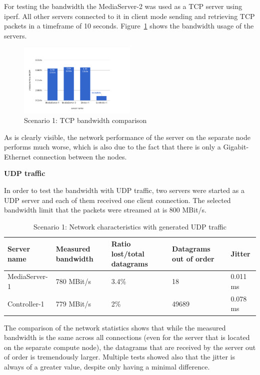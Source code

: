 For testing the bandwidth the MediaServer-2 was used as a TCP server using iperf. All other servers connected to it in client mode sending and retrieving TCP packets in a timeframe of 10 seconds. Figure~\ref{fig:scenario1-tcp} shows the bandwidth usage of the servers.

\begin{figure}[H]
\centering

\includegraphics[width=0.5\textwidth]{images/evaluation/testbed_scenario1_bw}

\caption{Scenario 1: TCP bandwidth comparison} \label{fig:scenario1-tcp}
\end{figure}

As is clearly visible, the network performance of the server on the separate node performs much worse, which is also due to the fact that there is only a Gigabit-Ethernet connection between the nodes.

\newpage
\textbf{UDP traffic} \label{sec:scenario1-udp}

In order to test the bandwidth with UDP traffic, two servers were started as a UDP server and each of them received one client connection. The selected bandwidth limit that the packets were streamed at is 800 MBit/s.

\begin{table}[H]
\centering

\begin{tabularx}{\textwidth}{ |X|X|X|X|X| }
\hline Server name & Measured bandwidth & Ratio lost/total datagrams & Datagrams out of order & Jitter \\ 
\hline MediaServer-1 & 780 MBit/s & 3.4\% & 18 & 0.011 ms\\ 
\hline Controller-1 & 779 MBit/s & 2\% & 49689 & 0.078 ms \\ 
\hline 
\end{tabularx}

\caption{Scenario 1: Network characteristics with generated UDP traffic}
\end{table}

The comparison of the network statistics shows that while the measured bandwidth is the same across all connections (even for the server that is located on the separate compute node), the datagrams that are received by the server out of order is tremendously larger. Multiple tests showed also that the jitter is always of a greater value, despite only having a minimal difference.


